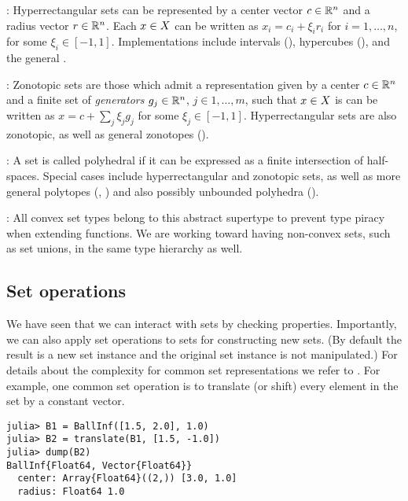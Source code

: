 : Hyperrectangular sets can be represented by a center vector $c \in \mathbb{R}^n$ and a radius vector $r \in \mathbb{R}^n$. Each $x \in X$ can be written as $x_i = c_i + \xi_i r_i$ for $i = 1,\ldots, n$, for some $\xi_i \in [-1, 1]$. Implementations include intervals (), hypercubes (), and the general .

\smallskip

: Zonotopic sets are those which admit a representation given by a center $c \in \mathbb{R}^n$ and a finite set of \emph{generators} $g_j \in \mathbb{R}^n$, $j \in 1, \ldots, m$, such that $x \in X$ is can be written as $x = c + \sum_j \xi_j g_j$ for some $\xi_j \in [-1, 1]$. Hyperrectangular sets are also zonotopic, as well as general zonotopes ().

\smallskip

: A set is called polyhedral if it can be expressed as a finite intersection of half-spaces. Special cases include hyperrectangular and zonotopic sets, as well as more general polytopes (, ) and also possibly unbounded polyhedra ().

\smallskip

: All convex set types belong to this abstract supertype to prevent type piracy when extending  functions.
We are working toward having non-convex sets, such as set unions, in the same type hierarchy as well.


\subsection{Set operations}

We have seen that we can interact with sets by checking properties.
Importantly, we can also apply set operations to sets for constructing new sets.
(By default the result is a new set instance and the original set instance is not manipulated.)
For details about the complexity for common set representations we refer to \cite[Table~1]{althoff2020set}.
For example, one common set operation is to translate (or shift) every element in the set by a constant vector.

\begin{minipage}{\linewidth}
\vspace{-\abovedisplayskip}
\begin{lstlisting}
julia> B1 = BallInf([1.5, 2.0], 1.0)
julia> B2 = translate(B1, [1.5, -1.0])
julia> dump(B2)
BallInf{Float64, Vector{Float64}}
  center: Array{Float64}((2,)) [3.0, 1.0]
  radius: Float64 1.0
\end{lstlisting}
\end{minipage}

